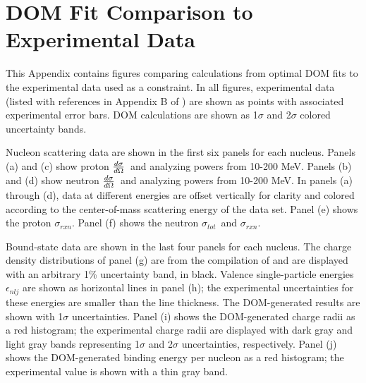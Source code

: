 \documentclass[twocolumn,secnumarabic,amssymb, nobibnotes, aps, prl,
superscriptaddress, nobalancelastpage]{revtex4}
\newcommand{\tot}{\ensuremath{\sigma_{tot}}}
\newcommand{\rxn}{\ensuremath{\sigma_{rxn}}}
\newcommand{\el}{\ensuremath{\frac{\lowercase{d}\sigma}{\lowercase{d}\Omega}}}
\begin{document}
\newpage
\appendix \label{DOMFitResults}
\section{DOM Fit Comparison to Experimental Data}
This Appendix contains figures comparing calculations from optimal DOM fits to
the experimental data used as a constraint. In all figures, experimental data
(listed with references in Appendix B of \cite{PruittPhDThesis}) are shown
as points with associated experimental error bars. DOM calculations are shown as
1$\sigma$ and 2$\sigma$ colored uncertainty bands. 

Nucleon scattering data are shown in the first six panels for each nucleus.
Panels (a) and (c) show proton \el\ and analyzing powers from 10-200 MeV.
Panels (b) and (d) show neutron \el\ and analyzing powers from 10-200 MeV.
In panels (a) through (d), data at different energies are offset
vertically for clarity and colored according to the center-of-mass scattering
energy of the data set. Panel (e) shows the proton \rxn. Panel (f) shows the
neutron \tot\ and \rxn.

Bound-state data are shown in the last four panels for each nucleus.
The charge density distributions of panel (g) are from the compilation of
\cite{DeVries1987} and are displayed with an arbitrary 1\% uncertainty
band, in black. Valence single-particle energies $\epsilon_{nlj}$ are shown as
horizontal lines in panel (h); the experimental uncertainties for these energies
are smaller than the line thickness. The DOM-generated results are shown with
1$\sigma$ uncertainties. Panel (i) shows the DOM-generated charge radii as a red
histogram; the experimental charge radii are displayed with dark gray and light
gray bands representing 1$\sigma$ and 2$\sigma$ uncertainties, respectively.
Panel (j) shows the DOM-generated binding energy per nucleon as a red
histogram; the experimental value is shown with a thin gray band.
\end{document}
